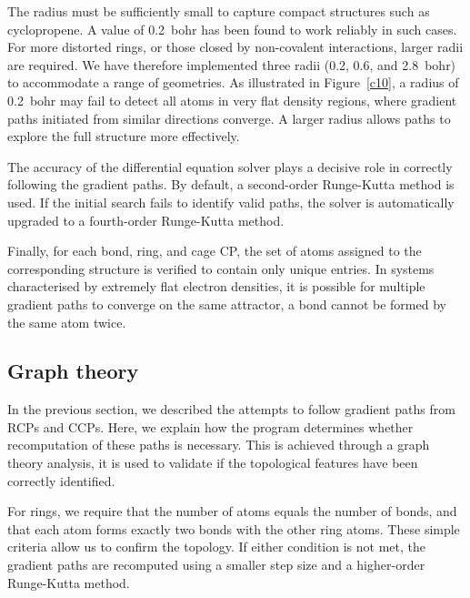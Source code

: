 \newpage
The radius must be sufficiently small to capture compact structures such
as cyclopropene. A value of 0.2~bohr has been found to work reliably in
such cases. For more distorted rings, or those closed by non-covalent
interactions, larger radii are required. We have therefore implemented
three radii (0.2, 0.6, and 2.8~bohr) to accommodate a range of
geometries. As illustrated in Figure~\ref{c10}, a radius of 0.2~bohr may
fail to detect all atoms in very flat density regions, where gradient
paths initiated from similar directions converge. A larger radius allows
paths to explore the full structure more effectively.

The accuracy of the differential equation solver plays a decisive role in
correctly following the gradient paths. By default, a second-order Runge-Kutta
method is used. If the initial search fails to identify valid paths, the solver
is automatically upgraded to a fourth-order Runge-Kutta method.

Finally, for each bond, ring, and cage \gls{CP}, the set of atoms assigned to
the corresponding structure is verified to contain only unique entries. In
systems characterised by extremely flat electron densities, it is possible for
multiple gradient paths to converge on the same attractor, \eg a bond cannot be
formed by the same atom twice.

\vspace{0.7cm}%
\subsection{Graph theory}

In the previous section, we described the attempts to follow gradient
paths from \glspl{RCP} and \glspl{CCP}. Here, we explain how the program
determines whether recomputation of these paths is necessary. This is
achieved through a graph theory analysis, it is used to validate if the
topological features have been correctly identified.

For rings, we require that the number of atoms equals the number of
bonds, and that each atom forms exactly two bonds with the other ring
atoms. These simple criteria allow us to confirm the topology. If either
condition is not met, the gradient paths are recomputed using a smaller
step size and a higher-order Runge-Kutta method.

\newpage

